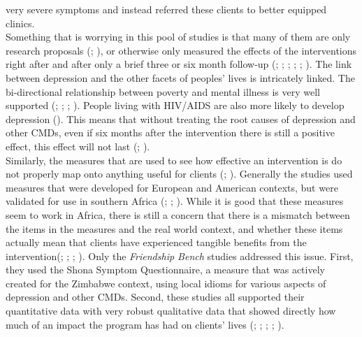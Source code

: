 \documentclass[stu,a4paper,12pt,donotrepeattitle]{apa7}
\begin{document}
very severe symptoms and instead referred these clients to better equipped
clinics.\\
Something that is worrying in this pool of studies is that many of them are
only research proposals (\cite{chibandaetal15}; \cite{lunetal14}), or otherwise
only measured the effects of the interventions right after and after only a
brief three or six month follow-up (\cite{chibandaetal11}; \cite{chibandaetal16};
\cite{douketal21}; \cite{fernaetal21}; \cite{nyatetal16}; \cite{petersenetal14}).
The link between depression and the other facets of peoples' lives
is intricately linked. The bi-directional relationship between poverty and
mental illness is very well supported (\cite{lundetal10}; \cite{lund12};
\cite{ridetal20}; \cite{wahl17}). People living with HIV/AIDS are also
more likely to develop depression (\cite{logetal18}). This means that without
treating the root causes of depression and other CMDs, even if six months after
the intervention there is still a positive effect, this effect will not last 
(\cite{kaz14}; \cite{shed18}).\\
Similarly, the measures that are used to see how effective an intervention is
do not properly map onto anything useful for clients (\cite{kaz14};
\cite{shed18}). Generally the studies used measures that were developed for
European and American contexts, but were validated for use in southern Africa
(\cite{lunetal14}; \cite{nyatetal16}; \cite{petersenetal14}).
While it is good that these measures seem to work in Africa, there is still a
concern that there is a mismatch between the items in the measures and the
real world context, and whether these items actually mean that clients have
experienced tangible benefits from the intervention(\cite{kaz14};
\cite{lunetal14}; \cite{nyatetal16}; \cite{shed18}). Only the \textit{Friendship
Bench} studies addressed this issue. First, they used the Shona Symptom
Questionnaire, a measure that was actively created for the Zimbabwe context,
using local idioms for various aspects of depression and other CMDs. Second,
these studies all supported their quantitative data with very robust
qualitative data that showed directly how much of an impact the program has had
on clients' lives (\cite{abasal16}; \cite{chibandaetal11}; \cite{chibandaetal15};
\cite{chibandaetal16}; \cite{fernaetal21}).
\end{document}
